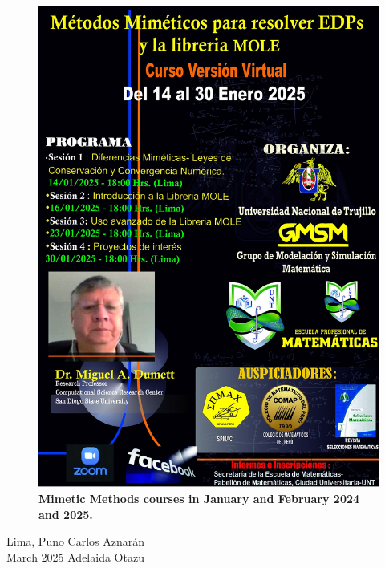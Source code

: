 \begin{figure}[ht!]
	\includegraphics[width=.32\paperwidth]{mole2025}
	\caption*{\bfseries Mimetic Methods courses in January and February 2024 and 2025.}
\end{figure}

\begin{flushright}
	Lima, Puno \hfill Carlos Aznarán \\[.5\baselineskip]

	March 2025 \hfill Adelaida Otazu
\end{flushright}
